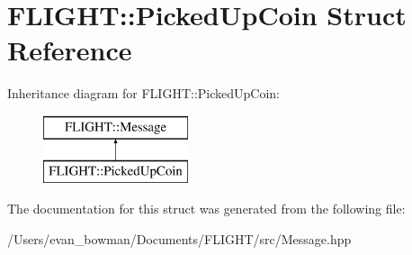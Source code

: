 \hypertarget{struct_f_l_i_g_h_t_1_1_picked_up_coin}{}\section{F\+L\+I\+G\+HT\+:\+:Picked\+Up\+Coin Struct Reference}
\label{struct_f_l_i_g_h_t_1_1_picked_up_coin}
Inheritance diagram for F\+L\+I\+G\+HT\+:\+:Picked\+Up\+Coin\+:\begin{figure}[H]
\begin{center}
\leavevmode
\includegraphics[height=2.000000cm]{struct_f_l_i_g_h_t_1_1_picked_up_coin}
\end{center}
\end{figure}


The documentation for this struct was generated from the following file\+:\begin{DoxyCompactItemize}
\item 
/\+Users/evan\+\_\+bowman/\+Documents/\+F\+L\+I\+G\+H\+T/src/Message.\+hpp\end{DoxyCompactItemize}
